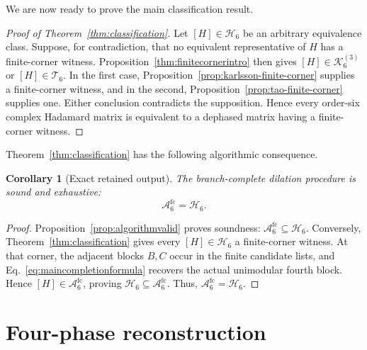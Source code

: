 \documentclass[aps,prx,reprint,nofootinbib,twoside,superscriptaddress,longbibliography,floatfix]{revtex4-2}
\newtheorem{corollary}[theorem]{Corollary}
\theoremstyle{definition}
\newcommand{\HH}{\mathcal H}
\newcommand{\KK}{\mathcal K}
\newcommand{\FCAtlas}{\mathcal A}
\begin{document}
We are now ready to prove the main classification result.

\begin{proof}[Proof of Theorem~\ref{thm:classification}]
Let $[H]\in\HH_6$ be an arbitrary equivalence class. Suppose, for contradiction, that no equivalent representative of $H$ has a finite-corner witness. Proposition~\ref{thm:finitecornerintro} then gives $[H]\in\KK_6^{(3)}$ or $[H]\in\mathcal T_6$. In the first case, Proposition~\ref{prop:karlsson-finite-corner} supplies a finite-corner witness, and in the second, Proposition~\ref{prop:tao-finite-corner} supplies one. Either conclusion contradicts the supposition. Hence every order-six complex Hadamard matrix is equivalent to a dephased matrix having a finite-corner witness.
\end{proof}

Theorem~\ref{thm:classification} has the following algorithmic consequence.

\begin{corollary}[Exact retained output]
\label{cor:atlas-classification}
The branch-complete dilation procedure is sound and exhaustive:
\begin{equation}
\FCAtlas_6^{\mathrm{fc}}=\HH_6.
\label{eq:completeclassification}
\end{equation}
\end{corollary}

\begin{proof}
Proposition~\ref{prop:algorithmvalid} proves soundness: $\FCAtlas_6^{\mathrm{fc}}\subseteq\HH_6$. Conversely, Theorem~\ref{thm:classification} gives every $[H]\in\HH_6$ a finite-corner witness. At that corner, the adjacent blocks $B,C$ occur in the finite candidate lists, and Eq.~\eqref{eq:maincompletionformula} recovers the actual unimodular fourth block. Hence
$[H]\in\FCAtlas_6^{\mathrm{fc}}$, proving
$\HH_6\subseteq\FCAtlas_6^{\mathrm{fc}}$. Thus, $\FCAtlas_6^{\mathrm{fc}}=\HH_6$.
\end{proof}

\section{Four-phase reconstruction}
\label{sec:finite-corner-reconstruction-space}
\label{sec:atlas}
\end{document}

